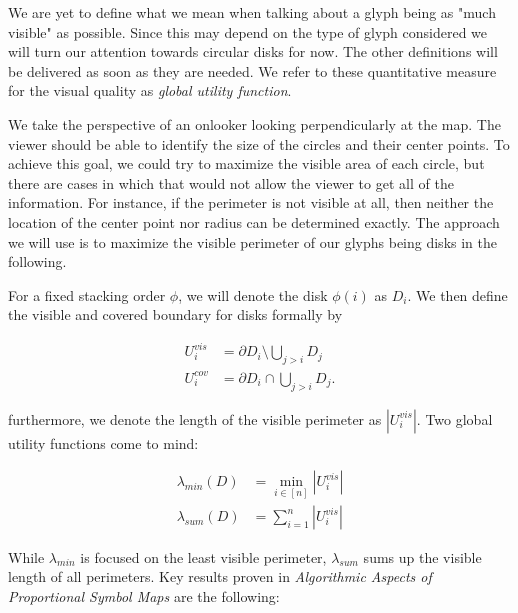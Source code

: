 \documentclass[a4paper,11pt]{article}
\begin{document}
We are yet to define what we mean when talking about a glyph being as "much visible" as possible. Since this may depend on the type of glyph considered we will turn our attention towards circular disks for now. The other definitions will be delivered as soon as they are needed. We refer to these quantitative measure for the visual quality as \textit{global utility function}.

We take the perspective of an onlooker looking perpendicularly at the map. The viewer should be able to identify the size of the circles and their center points. To achieve this goal, we could try to maximize the visible area of each circle, but there are cases in which that would not allow the viewer to get all of the information. For instance, if the perimeter is not visible at all, then neither the location of the center point nor radius can be determined exactly. The approach we will use is to maximize the visible perimeter of our glyphs being disks in the following.

\newpage

For a fixed stacking order $\phi$, we will denote the disk $\phi(i)$ as $D_i$. We then define the visible and covered boundary for disks formally by
 
\begin{align*}
  U_i^{vis} & =\partial D_i\setminus \bigcup_{j>i} D_{j} \\
  U_i^{cov} & =\partial D_i \cap \bigcup_{j>i} D_{j}.
\end{align*}
 
furthermore, we denote the length of the visible perimeter as $|U^{vis}_i|$. Two global utility functions come to mind:

\begin{align*}
  \lambda_{min} (D) &= \min_{i \in [n]}|U_i^{vis}|\\
  \lambda_{sum} (D) &= \sum_{i=1}^n|U_i^{vis}|
\end{align*}

While $\lambda_{min}$ is focused on the least visible perimeter, $\lambda_{sum}$ sums up the visible length of all perimeters. Key results proven in \textit{Algorithmic Aspects of Proportional Symbol Maps} are the following:
\end{document}
